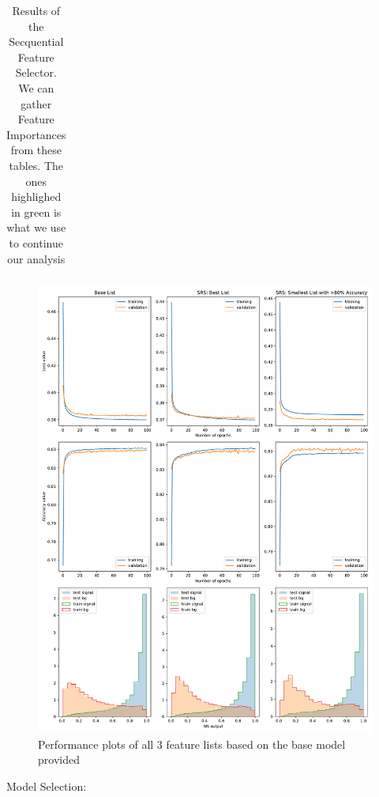 \documentclass[]{article}
\begin{document}
\begin{landscape}
\begin{table}[]
{\begin{tabular}{@{}lr@{}}
	\end{tabular}
	}
	\caption{Results of the Secquential Feature Selector. We can gather Feature Importances from these tables. The ones highlighed in green is what we use to continue our analysis}
	\label{table:SFS_results}
\end{table}

\end{landscape}



\begin{figure}[ht]
	\centering
	\includegraphics[width=\linewidth]{feature_comparison/feat-comparison.pdf}
	\caption{Performance plots of all 3 feature lists based on the base model provided}
	\label{fig:base_models}
\end{figure}


Model Selection:
\end{document}
